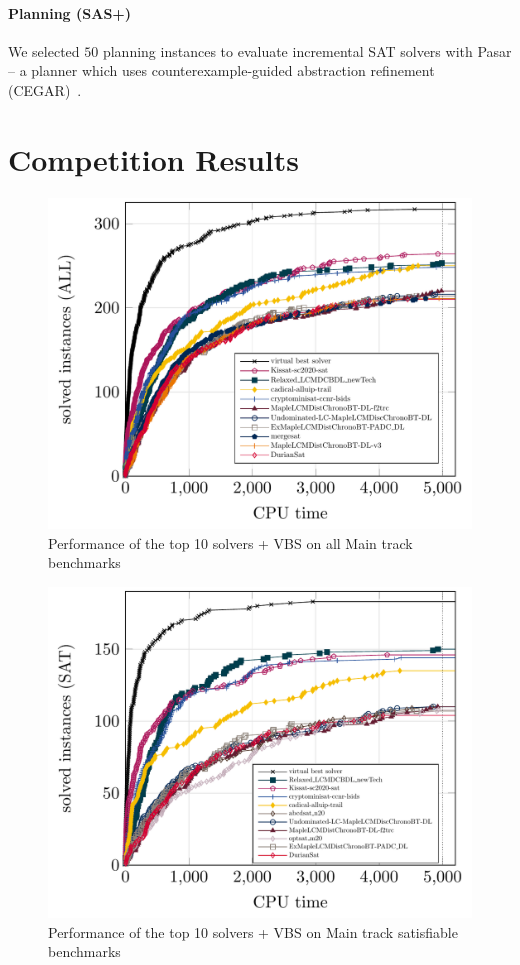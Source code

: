 \documentclass{elsarticle}
\begin{document}
\paragraph{Planning (SAS+)}
We selected $50$ planning instances to evaluate incremental SAT solvers with \textsf{Pasar} -- a planner which uses counter\-example-guided abstraction refinement (CEGAR)~\cite{Froleyks:2019:Pasar}. 


\section{Competition Results}
\label{sec:results}


\begin{figure}
\centering
\includegraphics[width=.9\textwidth]{img/paper-main-top10-ALL.pdf}
\caption{Performance of the top 10 solvers + VBS on all  Main track benchmarks}
\end{figure}

\begin{figure}
\centering
\includegraphics[width=.9\textwidth]{img/paper-main-top10-SAT.pdf}
\caption{Performance of the top 10 solvers + VBS on Main track satisfiable benchmarks}
\end{figure}
\end{document}
